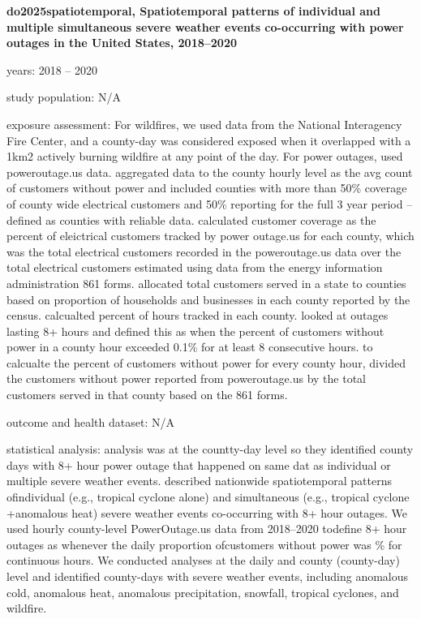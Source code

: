 \textbf{do2025spatiotemporal, Spatiotemporal patterns of individual and multiple simultaneous severe weather events co-occurring with power outages in the United States, 2018--2020}
    \item years: 2018 -- 2020
    \item study population: N/A
    \item exposure assessment: For wildfires, we used data from the National Interagency Fire Center, and a county-day was considered exposed when it overlapped with a \geq 1km2 actively burning wildfire at any point of the day. For power outages, used poweroutage.us data. aggregated data to the county hourly level as the avg count of customers without power and included counties with more than 50\% coverage of county wide electrical customers and 50\% reporting for the full 3 year period -- defined as counties with reliable data. calculated customer coverage as the percent of eleictrical customers tracked by power outage.us for each county, which was the total electrical customers recorded in the poweroutage.us data over the total electrical customers estimated using data from the energy information administration 861 forms. allocated total customers served in a state to counties based on proportion of households and businesses in each county reported by the census. calcualted percent of hours tracked in each county. looked at outages lasting 8+ hours and defined this as when the percent of customers without power in a county hour exceeded 0.1\% for at least 8 consecutive hours. to calcualte the percent of customers without power for every county hour, divided the customers without power reported from poweroutage.us by the total customers served in that county based on the 861 forms. 
    \item outcome and health dataset: N/A
    \item statistical analysis: analysis was at the countty-day level so they identified county days with 8+ hour power outage that happened on same dat as individual or multiple severe weather events. described nationwide spatiotemporal patterns ofindividual (e.g., tropical cyclone alone) and simultaneous (e.g., tropical cyclone +anomalous heat) severe weather events co-occurring with 8+ hour outages. We used hourly county-level PowerOutage.us data from 2018–2020 todefine 8+ hour outages as whenever the daily proportion ofcustomers without power was \% for  continuous hours. We conducted analyses at the daily and county (county-day) level and identified county-days with severe weather events, including anomalous cold, anomalous heat, anomalous precipitation, snowfall, tropical cyclones, and wildfire.
